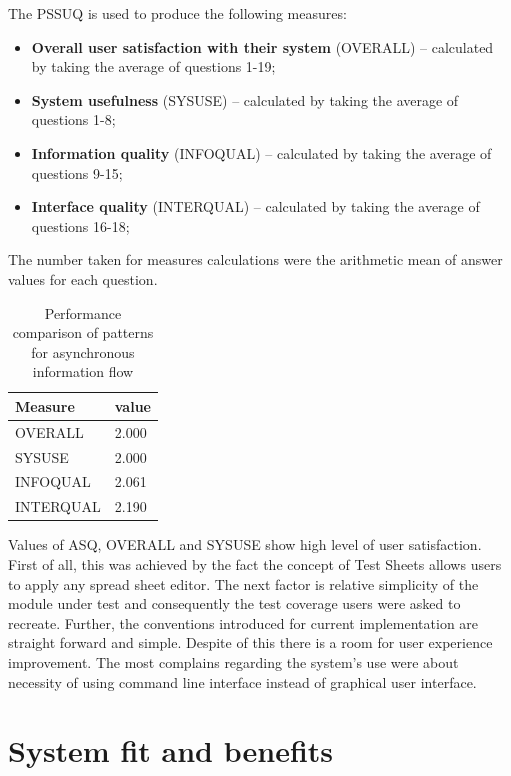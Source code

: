 The PSSUQ is used to produce the following measures:
\begin{itemize}
	\item \textbf{Overall user satisfaction with their system} (OVERALL) – calculated by taking the average of questions 1-19;
	\item  \textbf{System usefulness} (SYSUSE) – calculated by taking the average of questions 1-8;
	\item \textbf{Information quality} (INFOQUAL) – calculated by taking the average of questions 9-15;
	\item \textbf{Interface quality} (INTERQUAL) – calculated by taking the average of questions 16-18;
\end{itemize}

The number taken for measures calculations were the arithmetic mean of answer values for each question.
\begin{table}[h]
	\begin{center}
		\begin{tabular}{| l | l |  }
			\hline
			\textbf{Measure} & \textbf{value} \\
			\hline
			OVERALL & 2.000  \\
			\hline
			SYSUSE & 2.000  \\
			\hline
			INFOQUAL & 2.061 \\
			\hline
			INTERQUAL & 2.190 \\
			\hline
		\end{tabular}
	\end{center}
	\caption{Performance comparison of patterns for asynchronous information flow}
\end{table}

Values of ASQ, OVERALL and SYSUSE show high level of user satisfaction.
First of all, this was achieved by the fact the concept of Test Sheets allows users to apply any spread sheet editor. The next factor is relative simplicity of the module under test and consequently the test coverage users were asked to recreate. Further, the conventions introduced for current implementation are straight forward and simple. Despite of this there is a room for user experience improvement. The most complains regarding the system's use were about necessity of using command line interface instead of graphical user interface.

\chapter{System fit and benefits}
\label{chap:fitsBenefits}


